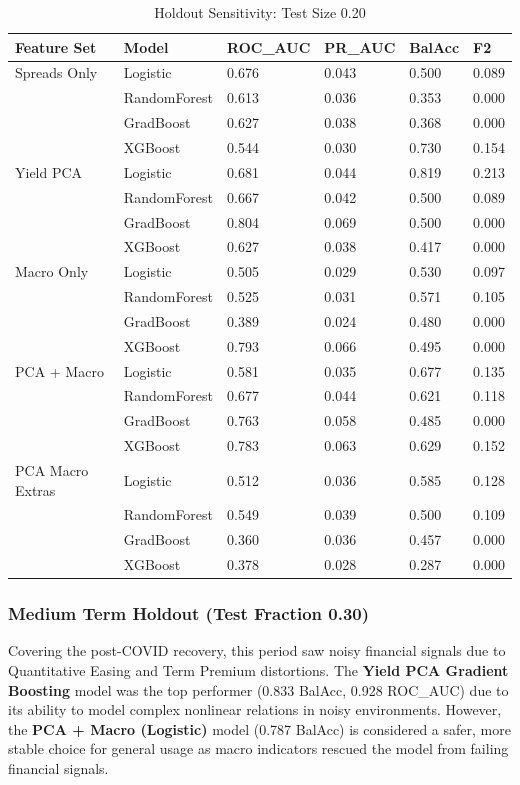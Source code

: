\begin{table}[h!]
\centering
\caption{Holdout Sensitivity: Test Size 0.20}
\small
\begin{tabular}{@{}llllll@{}}
\toprule
\textbf{Feature Set} & \textbf{Model} & \textbf{ROC\_AUC} & \textbf{PR\_AUC} & \textbf{BalAcc} & \textbf{F2} \\ \midrule
Spreads Only & Logistic & 0.676 & 0.043 & 0.500 & 0.089 \\
& RandomForest & 0.613 & 0.036 & 0.353 & 0.000 \\
& GradBoost & 0.627 & 0.038 & 0.368 & 0.000 \\
& XGBoost & 0.544 & 0.030 & 0.730 & 0.154 \\ \midrule
Yield PCA & Logistic & 0.681 & 0.044 & 0.819 & 0.213 \\
& RandomForest & 0.667 & 0.042 & 0.500 & 0.089 \\
& GradBoost & 0.804 & 0.069 & 0.500 & 0.000 \\
& XGBoost & 0.627 & 0.038 & 0.417 & 0.000 \\ \midrule
Macro Only & Logistic & 0.505 & 0.029 & 0.530 & 0.097 \\
& RandomForest & 0.525 & 0.031 & 0.571 & 0.105 \\
& GradBoost & 0.389 & 0.024 & 0.480 & 0.000 \\
& XGBoost & 0.793 & 0.066 & 0.495 & 0.000 \\ \midrule
PCA + Macro & Logistic & 0.581 & 0.035 & 0.677 & 0.135 \\
& RandomForest & 0.677 & 0.044 & 0.621 & 0.118 \\
& GradBoost & 0.763 & 0.058 & 0.485 & 0.000 \\
& XGBoost & 0.783 & 0.063 & 0.629 & 0.152 \\ \midrule
PCA Macro Extras & Logistic & 0.512 & 0.036 & 0.585 & 0.128 \\
& RandomForest & 0.549 & 0.039 & 0.500 & 0.109 \\
& GradBoost & 0.360 & 0.036 & 0.457 & 0.000 \\
& XGBoost & 0.378 & 0.028 & 0.287 & 0.000 \\ \bottomrule
\end{tabular}
\end{table}


\subsubsection{Medium Term Holdout (Test Fraction 0.30)}
Covering the post-COVID recovery, this period saw noisy financial signals due to Quantitative Easing and Term Premium distortions. The \textbf{Yield PCA Gradient Boosting} model was the top performer (0.833 BalAcc, 0.928 ROC\_AUC) due to its ability to model complex nonlinear relations in noisy environments. However, the \textbf{PCA + Macro (Logistic)} model (0.787 BalAcc) is considered a safer, more stable choice for general usage as macro indicators rescued the model from failing financial signals.


